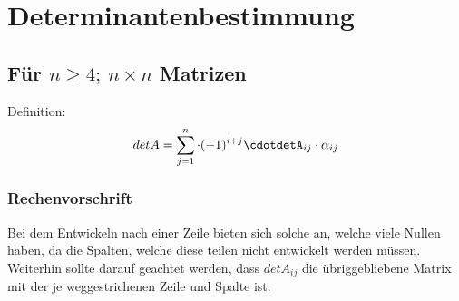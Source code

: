 \section{Determinantenbestimmung}
\subsection{Für $n \geq 4 ;\ n\times n$ Matrizen} \newline
\newline
\hspace*{10mm}%
Definition: \[detA = \sum_{j=1}^{n}\cdot(-1)^{i+j}\cdotdetA_{ij}\cdot\alpha_{ij} \] \newline
\newline
\subsubsection{Rechenvorschrift}
 Bei dem Entwickeln nach einer Zeile bieten sich solche an, welche viele Nullen haben, da die Spalten, welche diese teilen nicht entwickelt werden müssen.
 Weiterhin sollte darauf geachtet werden, dass $detA_{ij}$ die übriggebliebene Matrix mit der je weggestrichenen Zeile und Spalte ist.

